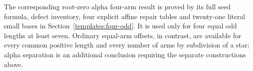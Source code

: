 The corresponding root-zero alpha four-arm result is proved by its full seed formula, defect inventory, four explicit affine repair tables and twenty-one literal small bases in Section~\ref{templates:four-odd}. It is used only for four equal odd lengths at least seven. Ordinary equal-arm offsets, in contrast, are available for every common positive length and every number of arms by subdivision of a star; alpha separation is an additional conclusion requiring the separate constructions above.
